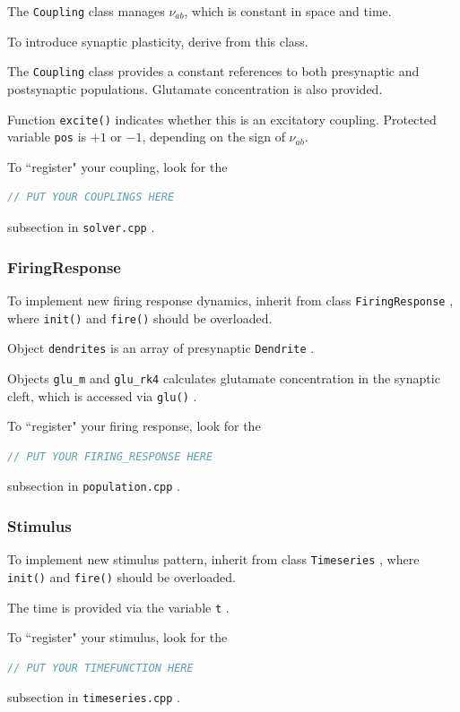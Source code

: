 \documentclass[12pt,a4paper]{article}
\newcommand{\type}[1]{{\small\small\tt #1} }
\begin{document}
The \type{Coupling} class manages \(\nu_{ab}\), which is constant in space and time.

To introduce synaptic plasticity, derive from this class.

The \type{Coupling} class provides a constant references to both presynaptic and postsynaptic populations. Glutamate concentration is also provided.

Function \type{excite()} indicates whether this is an excitatory coupling. Protected variable \type{pos} is $+1$ or $-1$, depending on the sign of \(\nu_{ab}\).

To ``register" your coupling, look for the
\begin{lstlisting}[language=C++]
// PUT YOUR COUPLINGS HERE
\end{lstlisting}
subsection in \type{solver.cpp}.

\subsubsection{FiringResponse}

To implement new firing response dynamics, inherit from class \type{FiringResponse}, where \type{init()} and \type{fire()} should be overloaded.

Object \type{dendrites} is an array of presynaptic \type{Dendrite}.

Objects \type{glu\_m} and \type{glu\_rk4} calculates glutamate concentration in the synaptic cleft, which is accessed via \type{glu()}.

To ``register" your firing response, look for the
\begin{lstlisting}[language=C++]
// PUT YOUR FIRING_RESPONSE HERE
\end{lstlisting}
subsection in \type{population.cpp}.

\subsubsection{Stimulus}

To implement new stimulus pattern, inherit from class \type{Timeseries}, where \type{init()} and \type{fire()} should be overloaded.

The time is provided via the variable \type{t}.

To ``register" your stimulus, look for the
\begin{lstlisting}[language=C++]
// PUT YOUR TIMEFUNCTION HERE
\end{lstlisting}
subsection in \type{timeseries.cpp}.
\end{document}
